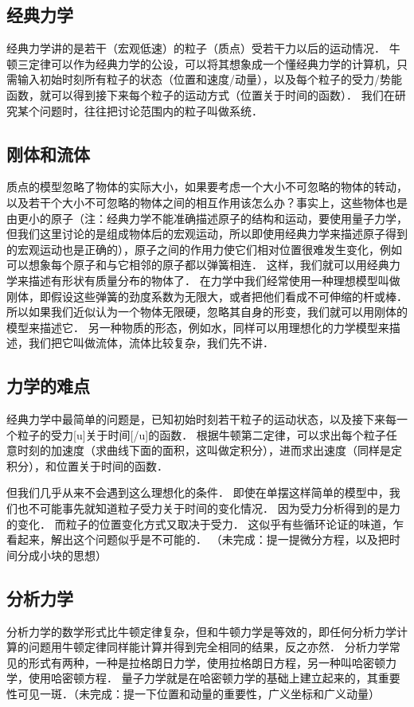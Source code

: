 
\subsection{经典力学}
经典力学讲的是若干（宏观低速）的粒子（质点）受若干力以后的运动情况． 牛顿三定律可以作为经典力学的公设，可以将其想象成一个懂经典力学的计算机，只需输入初始时刻所有粒子的状态（位置和速度/动量），以及每个粒子的受力/势能函数，就可以得到接下来每个粒子的运动方式（位置关于时间的函数）． 我们在研究某个问题时，往往把讨论范围内的粒子叫做系统．

\subsection{刚体和流体}
质点的模型忽略了物体的实际大小，如果要考虑一个大小不可忽略的物体的转动，以及若干个大小不可忽略的物体之间的相互作用该怎么办？事实上，这些物体也是由更小的原子（注：经典力学不能准确描述原子的结构和运动，要使用量子力学，但我们这里讨论的是组成物体后的宏观运动，所以即使用经典力学来描述原子得到的宏观运动也是正确的），原子之间的作用力使它们相对位置很难发生变化，例如可以想象每个原子和与它相邻的原子都以弹簧相连． 这样，我们就可以用经典力学来描述有形状有质量分布的物体了． 在力学中我们经常使用一种理想模型叫做刚体，即假设这些弹簧的劲度系数为无限大，或者把他们看成不可伸缩的杆或棒． 所以如果我们近似认为一个物体无限硬，忽略其自身的形变，我们就可以用刚体的模型来描述它． 另一种物质的形态，例如水，同样可以用理想化的力学模型来描述，我们把它叫做流体，流体比较复杂，我们先不讲．

\subsection{力学的难点}
经典力学中最简单的问题是，已知初始时刻若干粒子的运动状态，以及接下来每一个粒子的受力[u]关于时间[/u]的函数． 根据牛顿第二定律，可以求出每个粒子任意时刻的加速度（求曲线下面的面积，这叫做定积分），进而求出速度（同样是定积分），和位置关于时间的函数．

但我们几乎从来不会遇到这么理想化的条件． 即使在单摆这样简单的模型中，我们也不可能事先就知道粒子受力关于时间的变化情况． 因为受力分析得到的是力的变化． 而粒子的位置变化方式又取决于受力． 这似乎有些循环论证的味道，乍看起来，解出这个问题似乎是不可能的．
（未完成：提一提微分方程，以及把时间分成小块的思想）

\subsection{分析力学}
分析力学的数学形式比牛顿定律复杂，但和牛顿力学是等效的，即任何分析力学计算的问题用牛顿定律同样能计算并得到完全相同的结果，反之亦然． 分析力学常见的形式有两种，一种是拉格朗日力学，使用拉格朗日方程，另一种叫哈密顿力学，使用哈密顿方程． 量子力学就是在哈密顿力学的基础上建立起来的，其重要性可见一斑．（未完成：提一下位置和动量的重要性，广义坐标和广义动量）

